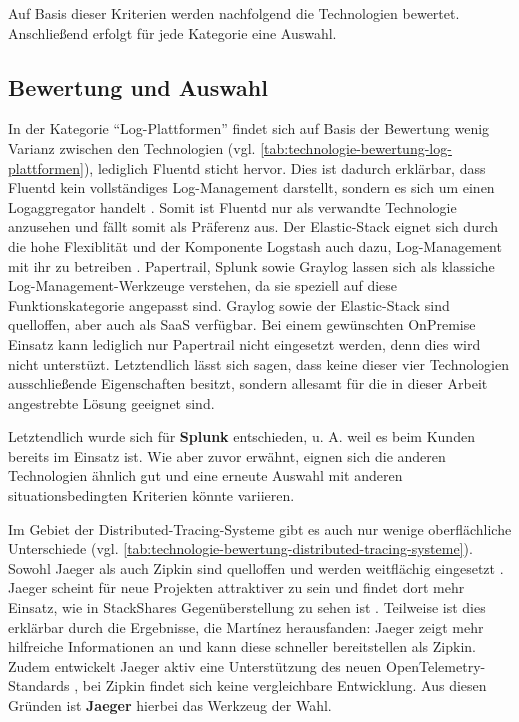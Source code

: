 Auf Basis dieser Kriterien werden nachfolgend die Technologien bewertet. Anschließend erfolgt für jede Kategorie eine Auswahl.

\subsection{Bewertung und Auswahl}
\label{subsec:bewertung-und-auswahl}

In der Kategorie \enquote{Log-Plattformen} findet sich auf Basis der Bewertung wenig Varianz zwischen den Technologien (vgl. \autoref{tab:technologie-bewertung-log-plattformen}), lediglich Fluentd sticht hervor. Dies ist dadurch erklärbar, dass Fluentd kein vollständiges Log-Management darstellt, sondern es sich um einen Logaggregator handelt \cite{FluentdAggregator}. Somit ist Fluentd nur als verwandte Technologie anzusehen und fällt somit als Präferenz aus. Der Elastic-Stack eignet sich durch die hohe Flexiblität und der Komponente Logstash auch dazu, Log-Management mit ihr zu betreiben  \cite{ThreatIdentificationFromAccessLogsUsingElasticStack} \cite{DesignLogManagementSystem}. Papertrail, Splunk sowie Graylog lassen sich als klassiche Log-Management-Werkzeuge verstehen, da sie speziell auf diese Funktionskategorie angepasst sind. Graylog sowie der Elastic-Stack sind quelloffen, aber auch als SaaS verfügbar. Bei einem gewünschten OnPremise Einsatz kann lediglich nur Papertrail nicht eingesetzt werden, denn dies wird nicht unterstüzt. Letztendlich lässt sich sagen, dass keine dieser vier Technologien ausschließende Eigenschaften besitzt, sondern allesamt für die in dieser Arbeit angestrebte Lösung geeignet sind.

Letztendlich wurde sich für \textbf{Splunk} entschieden, u. A. weil es beim Kunden bereits im Einsatz ist. Wie aber zuvor erwähnt, eignen sich die anderen Technologien ähnlich gut und eine erneute Auswahl mit anderen situationsbedingten Kriterien könnte variieren.



Im Gebiet der Distributed-Tracing-Systeme gibt es auch nur wenige oberflächliche Unterschiede (vgl. \autoref{tab:technologie-bewertung-distributed-tracing-systeme}). Sowohl Jaeger als auch Zipkin sind quelloffen und werden weitflächig eingesetzt \cite{AnalysisOfDistributedTracingSystemsEffectOnPerformance}. Jaeger scheint für neue Projekten attraktiver zu sein und findet dort mehr Einsatz, wie in StackShares Gegenüberstellung zu sehen ist \cite{StackShareJaegerVsZipkin}. Teilweise ist dies erklärbar durch die Ergebnisse, die Mart{\'i}nez \etal \cite{ComparisonOfE2ETestingToolsForMicroservices} herausfanden: Jaeger zeigt mehr hilfreiche Informationen an und kann diese schneller bereitstellen als Zipkin. Zudem entwickelt Jaeger aktiv eine Unterstützung des neuen OpenTelemetry-Standards \cite{JaegerOpenTelemetry}, bei Zipkin findet sich keine vergleichbare Entwicklung. Aus diesen Gründen ist \textbf{Jaeger} hierbei das Werkzeug der Wahl.

